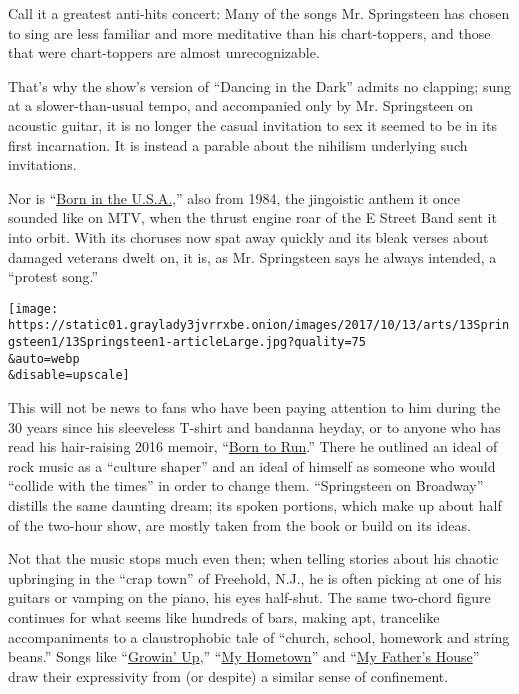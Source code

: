 Call it a greatest anti-hits concert: Many of the songs Mr. Springsteen
has chosen to sing are less familiar and more meditative than his
chart-toppers, and those that were chart-toppers are almost
unrecognizable.

That's why the show's version of ``Dancing in the Dark'' admits no
clapping; sung at a slower-than-usual tempo, and accompanied only by Mr.
Springsteen on acoustic guitar, it is no longer the casual invitation to
sex it seemed to be in its first incarnation. It is instead a parable
about the nihilism underlying such invitations.

Nor is ``\href{https://www.youtube.com/watch?v=EPhWR4d3FJQ}{Born in the
U.S.A.},'' also from 1984, the jingoistic anthem it once sounded like on
MTV, when the thrust engine roar of the E Street Band sent it into
orbit. With its choruses now spat away quickly and its bleak verses
about damaged veterans dwelt on, it is, as Mr. Springsteen says he
always intended, a ``protest song.''

\texttt{[image: https://static01.graylady3jvrrxbe.onion/images/2017/10/13/arts/13Springsteen1/13Springsteen1-articleLarge.jpg?quality=75\\\&auto=webp\\\&disable=upscale]}

This will not be news to fans who have been paying attention to him
during the 30 years since his sleeveless T-shirt and bandanna heyday, or
to anyone who has read his hair-raising 2016 memoir,
``\href{https://www.nytimes3xbfgragh.onion/2016/09/21/books/bruce-springsteen-memoir-born-to-run.html}{Born
to Run}.'' There he outlined an ideal of rock music as a ``culture
shaper'' and an ideal of himself as someone who would ``collide with the
times'' in order to change them. ``Springsteen on Broadway'' distills
the same daunting dream; its spoken portions, which make up about half
of the two-hour show, are mostly taken from the book or build on its
ideas.

Not that the music stops much even then; when telling stories about his
chaotic upbringing in the ``crap town'' of Freehold, N.J., he is often
picking at one of his guitars or vamping on the piano, his eyes
half-shut. The same two-chord figure continues for what seems like
hundreds of bars, making apt, trancelike accompaniments to a
claustrophobic tale of ``church, school, homework and string beans.''
Songs like ``\href{https://www.youtube.com/watch?v=1xY3q45EBt8}{Growin'
Up},'' ``\href{https://www.youtube.com/watch?v=77gKSp8WoRg}{My
Hometown}'' and ``\href{https://www.youtube.com/watch?v=d5xZmgFOuRA}{My
Father's House}'' draw their expressivity from (or despite) a similar
sense of confinement.

